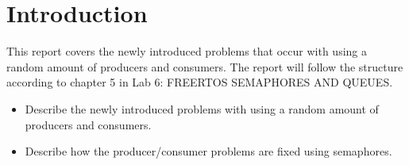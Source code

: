 \section{Introduction}
\label{section:intro}
This report covers the newly introduced problems that occur with using a random amount of producers and consumers. The report will follow the structure according to chapter 5 in Lab 6: FREERTOS SEMAPHORES AND QUEUES.

\begin{itemize}
  \item Describe the newly introduced problems with using a random amount of producers and consumers.
  \item Describe how the producer/consumer problems are fixed using semaphores.
\end{itemize}

